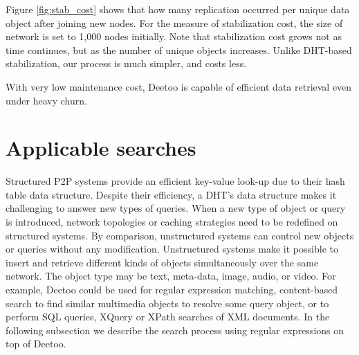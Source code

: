 \documentclass[conference]{IEEEtran}
\begin{document}
Figure \ref{fig:stab_cost} shows that how many replication occurred per unique
data object after joining new nodes. 
For the measure of stabilization cost, 
the size of network is set to 1,000 nodes initially. 
Note that stabilization cost grows not as time continues, but as the number of unique 
objects increases.
Unlike DHT-based stabilization, our process is much simpler, and costs less.

With very low maintenance cost, Deetoo is capable of efficient data retrieval 
even under heavy churn.

\iffalse
\section{Applicable searches}
Structured P2P systems provide an efficient key-value look-up due to 
their hash table data structure.
Despite their efficiency, a DHT's data structure makes it challenging to answer new
types of queries.
When a new type of object or query is introduced, network topologies or 
caching strategies need to be redefined on structured systems. By comparison, 
unstructured systems can control new objects or queries without any modification. 
Unstructured systems make it possible to insert and retrieve 
different kinds of objects simultaneously over the same network.
The object type may be text, meta-data, image, audio, or video.
For example, Deetoo could be used for regular expression
matching, content-based search to find similar multimedia objects to
resolve some query object, or to perform SQL queries, XQuery or XPath searches of XML
documents. In the following subsection we describe the search process using 
regular expressions on top of Deetoo.
 
\end{document}
